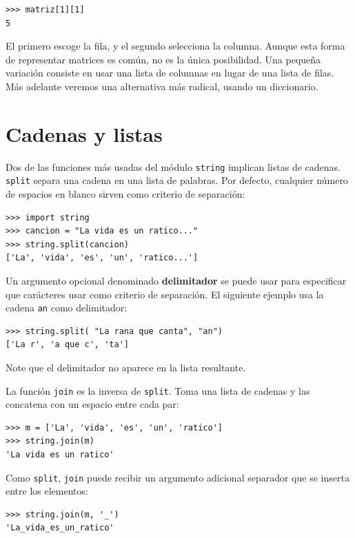 \beforeverb
\begin{verbatim}
>>> matriz[1][1]
5
\end{verbatim}
\afterverb
%
El primero escoge la fila, y el segundo selecciona la columna.
Aunque esta forma de representar matrices es común, no es la
única posibilidad. Una pequeña variación consiste en usar una 
lista de columnas en lugar de una lista de filas. Más adelante
veremos una alternativa más radical, usando un diccionario.



\section{Cadenas y listas}

Dos de las funciones más usadas del módulo  \texttt{string} implican
listas de cadenas. \texttt{split} separa una cadena en una lista
de palabras. Por defecto, cualquier número de espacios en blanco sirven
como criterio de separación:

\beforeverb
\begin{verbatim}
>>> import string
>>> cancion = "La vida es un ratico..."
>>> string.split(cancion)
['La', 'vida', 'es', 'un', 'ratico...']
\end{verbatim}
\afterverb
%
Un argumento opcional denominado  {\bf delimitador} se puede usar
para especificar que carácteres usar como criterio de separación.
El siguiente ejemplo usa la cadena \texttt{an} como delimitador:

\beforeverb
\begin{verbatim}
>>> string.split( "La rana que canta", "an")
['La r', 'a que c', 'ta']
\end{verbatim}
\afterverb
%
Note que el delimitador no aparece en la lista resultante.

La función \texttt{join} es la inversa de \texttt{split}.  Toma 
una lista de cadenas y las concatena con un espacio entre
cada par:

\beforeverb
\begin{verbatim}
>>> m = ['La', 'vida', 'es', 'un', 'ratico']
>>> string.join(m)
'La vida es un ratico'
\end{verbatim}
\afterverb
%
Como  \texttt{split}, \texttt{join} puede recibir un argumento 
adicional separador que se inserta entre los elementos:

\beforeverb
\begin{verbatim}
>>> string.join(m, '_')
'La_vida_es_un_ratico'
\end{verbatim}
\afterverb


